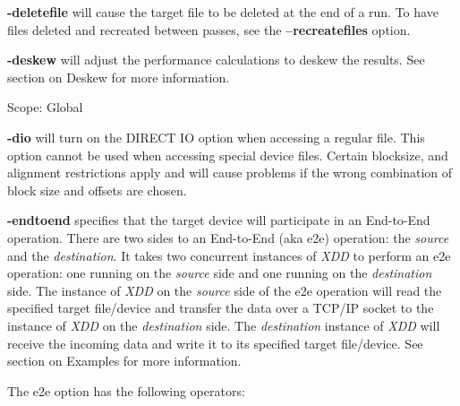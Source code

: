 \textbf{-deletefile} will cause the target file to be deleted at the end of a run. To have files deleted and recreated between passes, see the \textbf{--recreatefiles} option.

\textbf{-deskew} will adjust the performance calculations to deskew the results. See section on Deskew for more information.

Scope: Global

\textbf{-dio} will turn on the DIRECT IO option when accessing a regular file. This option cannot be used when accessing special device files. Certain blocksize, and alignment restrictions apply and will cause problems if the wrong combination of block size and offsets are chosen.

\textbf{-endtoend} specifies that the target device will participate in an End-to-End operation. There are two sides to an End-to-End (aka e2e) operation: the \emph{source} and the \emph{destination}. It takes two concurrent instances of \emph{XDD} to perform an e2e operation: one running on the \emph{source} side and one running on the \emph{destination} side. The instance of \emph{XDD} on the \emph{source} side of the e2e operation will read the specified target file/device and transfer the data over a TCP/IP socket to the instance of \emph{XDD} on the \emph{destination} side. The \emph{destination} instance of \emph{XDD} will receive the incoming data and write it to its specified target file/device. See section on Examples for more information.

The e2e option has the following operators:

